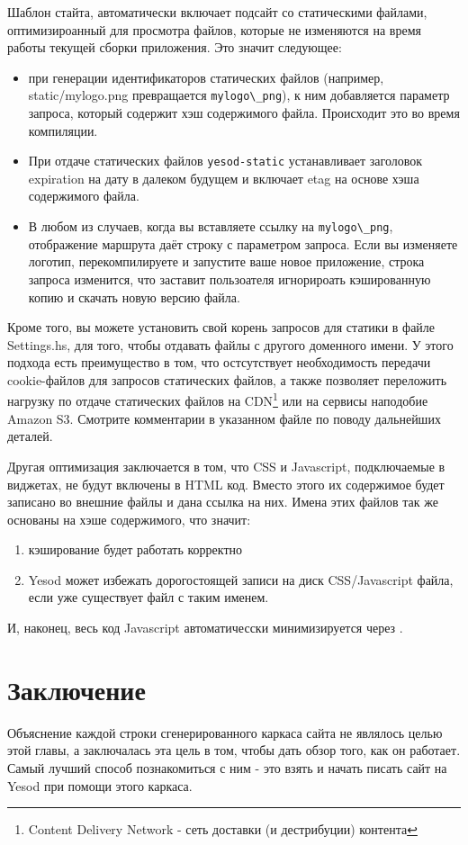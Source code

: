 Шаблон стайта, автоматически включает подсайт со статическими файлами, оптимизироанный для просмотра
файлов, которые не изменяются на время работы текущей сборки приложения. Это значит следующее:

\begin{itemize}
  \item при генерации идентификаторов статических файлов (например, static/mylogo.png
    превращается  \lstinline!mylogo\_png!), к ним добавляется параметр запроса, который содержит
    хэш содержимого файла. Происходит это во время компиляции.
  \item При отдаче статических файлов \lstinline!yesod-static! устанавливает заголовок expiration
    на дату в далеком будущем и включает etag на основе хэша содержимого файла.
  \item В любом из случаев, когда вы вставляете  ссылку на \lstinline!mylogo\_png!, отображение
    маршрута даёт строку с параметром запроса. Если вы изменяете логотип, перекомпилируете и
    запустите ваше новое приложение, строка запроса изменится, что заставит пользоателя игнорироать
    кэшированную копию и скачать новую версию файла.
\end{itemize}

Кроме того, вы можете установить свой корень запросов для статики в файле Settings.hs, для того, чтобы
отдавать файлы  с другого доменного имени. У этого подхода есть преимущество в том, что остсутствует
необходимость передачи cookie-файлов для запросов статических файлов, а также позволяет переложить
нагрузку по отдаче статических файлов на CDN\footnote{Content Delivery Network - сеть доставки (и
дестрибуции) контента} или на сервисы наподобие Amazon S3. Смотрите комментарии в указанном файле
по поводу дальнейших деталей.

Другая оптимизация заключается в том, что CSS и Javascript, подключаемые в виджетах, не будут
включены в HTML код. Вместо этого их содержимое будет записано во внешние файлы и дана ссылка на них.
Имена этих файлов так же основаны на хэше содержимого, что значит:
\begin{enumerate}
  \item кэширование будет работать корректно
  \item Yesod может избежать дорогостоящей записи на диск CSS/Javascript файла, если уже существует
    файл с таким именем.
\end{enumerate}

И, наконец, весь код Javascript автоматичесски минимизируется через .

\section{Заключение}

Объяснение каждой строки сгенерированного каркаса сайта не являлось целью этой главы, а заключалась эта цель в том, чтобы дать обзор того, как он работает. Самый лучший способ познакомиться с ним - это взять и начать писать сайт на Yesod при помощи этого каркаса.
